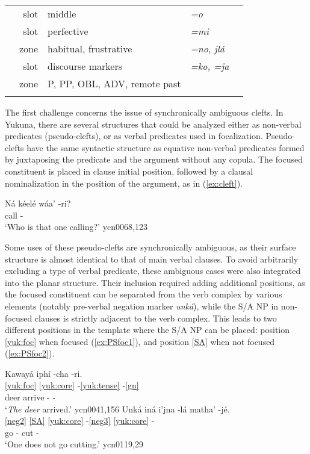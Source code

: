 \documentclass[output=paper]{langscibook}
\begin{document}
\begin{table}
\begin{tabular}{Srlll}
\label{mid}              & slot          & middle                         & \textit{=o}                \\
\label{pfv}               & slot          & perfective                 & \textit{=mi}               \\
\label{hab}              & zone          & habitual, frustrative                         & \textit{=no}, \textit{jlá}                \\
\label{disc}              & slot          & discourse markers                            & \textit{=ko, =ja}                  \\
\label{yuk:obl}               & zone          & P, PP, OBL, ADV, remote past                 & \textit{}                  \\
\lspbottomrule
\end{tabular}
\end{table}


The first challenge concerns the issue of synchronically ambiguous clefts. In Yukuna, there are several structures that could be analyzed either as non-verbal predicates (pseudo-clefts), or as verbal predicates used in focalization. Pseudo-clefts have the same syntactic structure as equative non-verbal predicates formed by juxtaposing the predicate and the argument without any copula. The focused constituent is placed in clause initial position, followed by a clausal nominalization in the position of the argument, as in (\ref{ex:cleft}). 


\ea
 \label{ex:cleft}
	\gll Ná kéelé wáa' -ri?\\
	   	\Indf{} \Dem{} call -\M{}	\\
	\glt `Who is that one calling?' \hfill ycn0068,123
\z

Some uses of these pseudo-clefts are synchronically ambiguous, as their surface structure is almost identical to that of main verbal clauses. To avoid arbitrarily excluding a type of verbal predicate, these ambiguous cases were also integrated into the planar structure. Their inclusion required adding additional positions, as the focused constituent can be separated from the verb complex by various elements (notably pre-verbal negation marker \textit{unká}), while the S/A NP in non-focused clauses is strictly adjacent to the verb complex. This leads to two different positions in the template where the S/A NP can be placed: position \ref{yuk:foc} when focused (\ref{ex:PSfoc1}), and position \ref{SA} when not focused (\ref{ex:PSfoc2}). 

\ea \label{ex:PSfoc}
	\ea \label{ex:PSfoc1}
	\glll Kawayá  iphí -cha -ri.\\
	    \ref{yuk:foc} \ref{yuk:core} -\ref{yuk:tense} -\ref{gn} \\
		deer arrive -\Pst{} -\M{}	\\
	\glt `\textit{The deer} arrived.' \hfill ycn0041,156
	\ex \label{ex:PSfoc2}
    \glll Unká iná i'jna -lá matha' -jé.	\\
		    \ref{neg2} \ref{SA} \ref{yuk:core} -\ref{neg3} \ref{yuk:core} - \\
			\Neg{} \Indf{} go -\Neg{} cut -\Purp{}\\
	\glt `One does not go cutting.' \hfill ycn0119,29
	\z
\z
\end{document}
